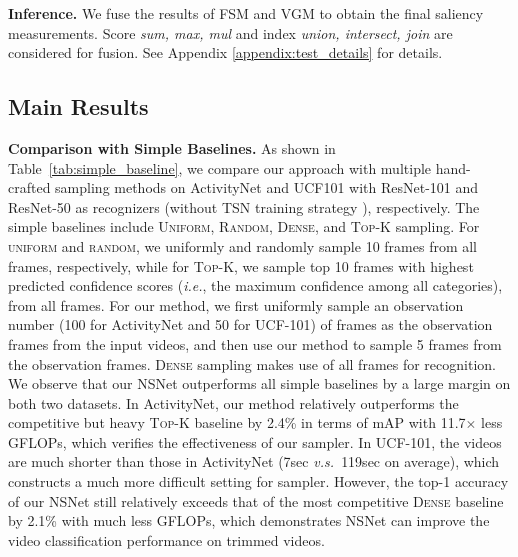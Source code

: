 \documentclass[runningheads]{llncs}
\newcommand{\tabref}[1]{Table~\ref{#1}}
\def\ie{\emph{i.e.}}
\def\vs{\emph{v.s.~}}
\begin{document}
\noindent\textbf{Inference.}
\label{sec:infer}
We fuse the results of FSM and VGM to obtain the final saliency measurements. Score \emph{sum, max, mul} and index \emph{union, intersect, join} are considered for fusion. See Appendix \ref{appendix:test_details} for details.

\subsection{Main Results}
\label{main_results}
\noindent\textbf{Comparison with Simple Baselines.}
As shown in \tabref{tab:simple_baseline}, we compare our approach with multiple hand-crafted sampling methods on ActivityNet and UCF101 with ResNet-101 and ResNet-50 as recognizers (without TSN training strategy \cite{tsn}), respectively. The simple baselines include \textsc{Uniform}, \textsc{Random}, \textsc{Dense}, and \textsc{Top-K} sampling. For \textsc{uniform} and \textsc{random}, we uniformly and randomly sample 10 frames from all frames, respectively, while for \textsc{Top-K}, we sample top 10 frames with highest predicted confidence scores (\ie, the maximum confidence among all categories), from all frames. For our method, we first uniformly sample an observation number (100 for ActivityNet and 50 for UCF-101) of frames as the observation frames from the input videos, and then use our method to sample 5 frames from the observation frames. \textsc{Dense} sampling makes use of all frames for recognition. We observe that our NSNet outperforms all simple baselines by a large margin on both two datasets. In ActivityNet, our method relatively outperforms the competitive but heavy \textsc{Top-K} baseline by 2.4\% in terms of mAP with 11.7$\times$ less GFLOPs, which verifies the effectiveness of our sampler. In UCF-101, the videos are much shorter than those in ActivityNet (7sec \vs 119sec on average), which constructs a much more difficult setting for sampler. However, the top-1 accuracy of our NSNet still relatively exceeds that of the most competitive \textsc{Dense} baseline by 2.1\% with much less GFLOPs, which demonstrates NSNet can improve the video classification performance on trimmed videos. 
\end{document}
